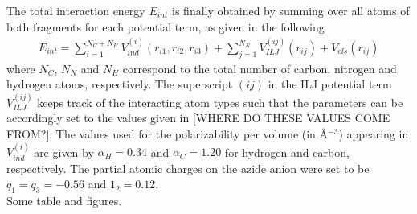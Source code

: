 \documentclass[utf8]{article}
\begin{document}
The total interaction energy $E_{int}$ is finally obtained by summing over all atoms of both fragments for each potential term, as given in the following
%
\begin{align}
    E_{int} = \sum_{i=1}^{N_C + N_H} V^{(i)}_{ind}(r_{i1},r_{i2},r_{i3}) +
              \sum_{j=1}^{N_N} V_{ILJ}^{(ij)}(r_{ij}) + V_{els}(r_{ij})
\end{align}
%
where $N_C$, $N_N$ and $N_H$ correspond to the total number of carbon, nitrogen and hydrogen atoms, respectively.
The superscript $(ij)$ in the ILJ potential term $V_{ILJ}^{(ij)}$ keeps track of the interacting atom types such that the parameters can be accordingly set to the values given in  [WHERE DO THESE VALUES COME FROM?].
The values used for the polarizability per volume (in \AA$^{-3}$) appearing in $V^(i)_{ind}$ are given by $\alpha_H = 0.34$ and $\alpha_C = 1.20$ for hydrogen and carbon, respectively.
The partial atomic charges on the azide anion were set to be $q_1 = q_3 = -0.56$ and $1_2 = 0.12$.\\

Some table and figures.


\clearpage




\clearpage
\end{document}
